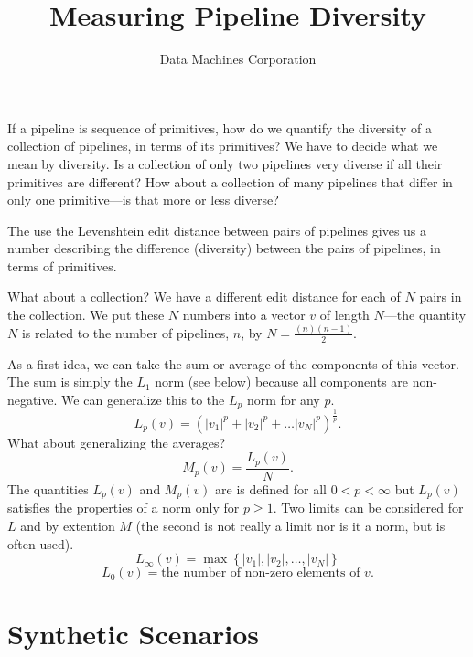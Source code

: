 \documentclass{article}
\title{Measuring Pipeline Diversity}
\author{Data Machines Corporation}
\begin{document}
\maketitle

If a pipeline is sequence of primitives, how do we quantify the
diversity of a collection of pipelines, in terms of its primitives?
We have to decide what we mean by diversity.  Is a collection of only
two pipelines very diverse if all their primitives are different?  How
about a collection of many pipelines that differ in only one
primitive---is that more or less diverse?

The use the Levenshtein edit distance between pairs of pipelines gives
us a number describing the difference (diversity) between the pairs of
pipelines, in terms of primitives.

What about a collection?  We have a different edit distance for each
of $N$ pairs in the collection.  We put these $N$ numbers into a
vector $v$ of length $N$---the quantity $N$ is related to the number
of pipelines, $n$, by $N = \frac{(n)(n-1)}{2}$.

As a first idea, we can take the sum or average of the components of
this vector.  The sum is simply the $L_1$ norm (see below) because all
components are non-negative.  We can generalize this to the $L_p$ norm
for any $p$.
$$L_p(v) = \left(|v_1|^p + |v_2|^p + \dots
|v_N|^p\right)^\frac{1}{p}.$$ What about generalizing the averages?
$$M_p(v) = \frac{L_p(v)}{N}.$$ The quantities $L_p(v)$ and $M_p(v)$
are is defined for all $0 < p < \infty$ but $L_p(v)$ satisfies the
properties of a norm only for $p \geq 1$. Two limits can be considered
for $L$ and by extention $M$ (the second is not really a limit nor is
it a norm, but is often used).
$$L_\infty(v) = \max\left\{|v_1|, |v_2|, \dots, |v_N|\right\}$$
$$L_0(v) = \mbox{the number of non-zero elements of $v$}.$$

\newpage
\section{Synthetic Scenarios}
\end{document}
